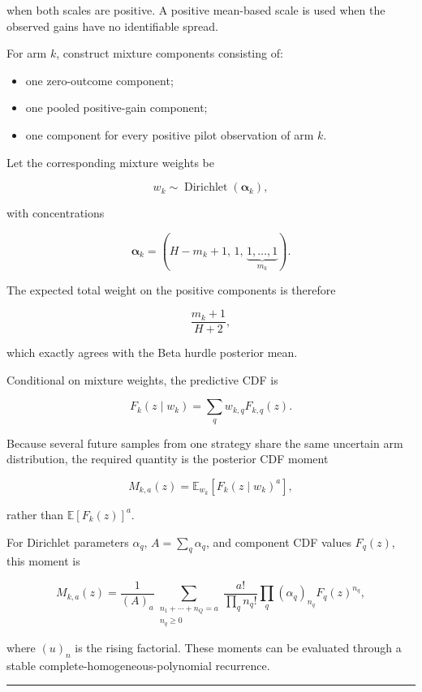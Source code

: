 \documentclass[
]{article}
\providecommand{\tightlist}{%
  \setlength{\itemsep}{0pt}\setlength{\parskip}{0pt}}
\begin{document}
when both scales are positive. A positive mean-based scale is used when
the observed gains have no identifiable spread.

For arm \(k\), construct mixture components consisting of:

\begin{itemize}
\tightlist
\item
  one zero-outcome component;
\item
  one pooled positive-gain component;
\item
  one component for every positive pilot observation of arm \(k\).
\end{itemize}

Let the corresponding mixture weights be

\[
w_k\sim\operatorname{Dirichlet}(\boldsymbol{\alpha}_k),
\]

with concentrations

\[
\boldsymbol{\alpha}_k
=
\left(
H-m_k+1,\,
1,\,
\underbrace{1,\ldots,1}_{m_k}
\right).
\]

The expected total weight on the positive components is therefore

\[
\frac{m_k+1}{H+2},
\]

which exactly agrees with the Beta hurdle posterior mean.

Conditional on mixture weights, the predictive CDF is

\[
F_k(z\mid w_k)
=
\sum_{q}w_{k,q}F_{k,q}(z).
\]

Because several future samples from one strategy share the same
uncertain arm distribution, the required quantity is the posterior CDF
moment

\[
M_{k,a}(z)
=
\mathbb{E}_{w_k}
\left[
F_k(z\mid w_k)^a
\right],
\]

rather than \(\mathbb{E}[F_k(z)]^a\).

For Dirichlet parameters \(\alpha_q\), \(A=\sum_q\alpha_q\), and
component CDF values \(F_q(z)\), this moment is

\[
M_{k,a}(z)
=
\frac{1}{(A)_a}
\sum_{\substack{n_1+\cdots+n_Q=a\\n_q\ge 0}}
\frac{a!}{\prod_q n_q!}
\prod_q
(\alpha_q)_{n_q}
F_q(z)^{n_q},
\]

where \((u)_n\) is the rising factorial. These moments can be evaluated
through a stable complete-homogeneous-polynomial recurrence.

\begin{center}\rule{0.5\linewidth}{0.5pt}\end{center}
\end{document}

